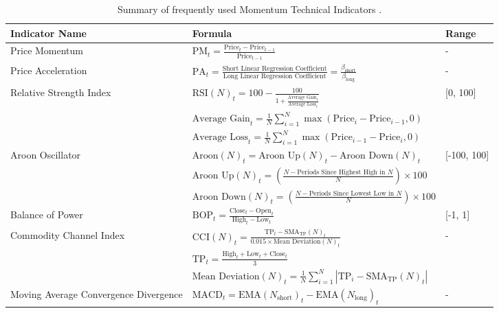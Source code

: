 \begin{table}[htb!]
\caption{Summary of frequently used Momentum Technical Indicators \cite{jansen_machine_2020}.}
\label{Tables:MomentumIndicators}
\centering
\footnotesize
\begin{tabularx}{\textwidth}{@{}lXl@{}}
\toprule
\textbf{Indicator Name} & \textbf{Formula} & \textbf{Range} \\ 
\midrule
Price Momentum & $\text{PM}_t = \frac{\text{Price}_t - \text{Price}_{t-1}}{\text{Price}_{t-1}}$ & - \\
\addlinespace
Price Acceleration & $\text{PA}_t = \frac{\text{Short Linear Regression Coefficient}}{\text{Long Linear Regression Coefficient}} = \frac{\beta_\text{short}}{\beta_\text{long}}$ & - \\
\addlinespace
Relative Strength Index & $\text{RSI}(N)_t = 100 - \frac{100}{1 + \frac{\text{Average Gain}_t}{\text{Average Loss}_t}}$ & [0, 100] \\
\addlinespace
& $\text{Average Gain}_t = \frac{1}{N}\sum_{i=1}^{N} \max(\text{Price}_i - \text{Price}_{i-1}, 0)$ & \\
\addlinespace
& $\text{Average Loss}_t = \frac{1}{N}\sum_{i=1}^{N} \max(\text{Price}_{i-1} - \text{Price}_i, 0)$ & \\
\addlinespace
Aroon Oscillator & $\text{Aroon}(N)_t = \text{Aroon Up}(N)_t - \text{Aroon Down}(N)_t$ & [-100, 100] \\
\addlinespace
& $\text{Aroon Up}(N)_t = \left( \frac{N - \text{Periods Since Highest High in } N}{N} \right) \times 100$ & \\
\addlinespace
& $\text{Aroon Down}(N)_t = \left( \frac{N - \text{Periods Since Lowest Low in } N}{N} \right) \times 100$ & \\
\addlinespace
Balance of Power & $\text{BOP}_t = \frac{\text{Close}_t - \text{Open}_t}{\text{High}_t - \text{Low}_t}$ & [-1, 1] \\
\addlinespace
Commodity Channel Index & $\text{CCI}(N)_t = \frac{\text{TP}_t - \text{SMA}_\text{TP}(N)_t}{0.015 \times \text{Mean Deviation}(N)_t}$ & - \\
\addlinespace
& $\text{TP}_t = \frac{\text{High}_t + \text{Low}_t + \text{Close}_t}{3}$ & \\
\addlinespace
& $\text{Mean Deviation}(N)_t = \frac{1}{N}\sum_{i=1}^{N} |\text{TP}_i - \text{SMA}_\text{TP}(N)_t|$ & \\
\addlinespace
Moving Average Convergence Divergence & $\text{MACD}_t = \text{EMA}(N_{\text{short}})_t - \text{EMA}(N_{\text{long}})_t $ & - \\

\end{tabularx}
\end{table}
